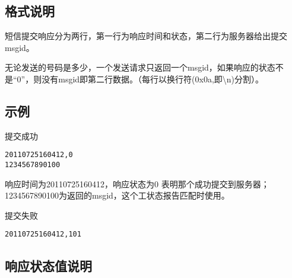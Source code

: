 \documentclass[11pt]{book} %
\begin{document}
\subsection{格式说明}

短信提交响应分为两行，第一行为响应时间和状态，第二行为服务器给出提交msgid。

无论发送的号码是多少，一个发送请求只返回一个msgid，如果响应的状态不是“0”，则没有msgid即第二行数据。（每行以换行符(0x0a,即\textbackslash n)分割）。


\subsection{示例}

\begin{compactitem}
\item 提交成功

\begin{lstlisting}
20110725160412,0
1234567890100
\end{lstlisting}

响应时间为20110725160412，响应状态为0 表明那个成功提交到服务器；1234567890100为返回的msgid，这个工状态报告匹配时使用。

\item 提交失败

\begin{lstlisting}
20110725160412,101
\end{lstlisting}

\end{compactitem}

\subsection{响应状态值说明}
\end{document}
